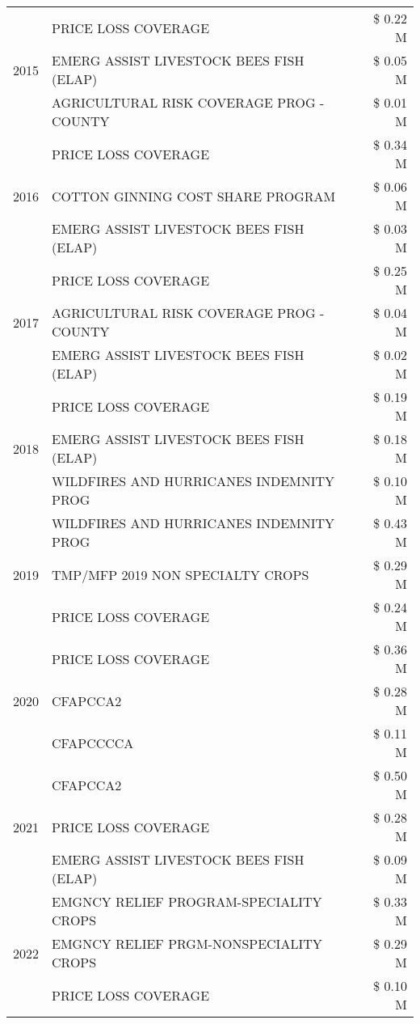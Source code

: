 \begin{tabular}{llr}
\cline{1-3}
\multirow[t]{3}{*}{2015} & PRICE LOSS COVERAGE & \$ 0.22 M \\
 & EMERG ASSIST LIVESTOCK BEES FISH (ELAP) & \$ 0.05 M \\
 & AGRICULTURAL RISK COVERAGE PROG - COUNTY & \$ 0.01 M \\
\cline{1-3}
\multirow[t]{3}{*}{2016} & PRICE LOSS COVERAGE & \$ 0.34 M \\
 & COTTON GINNING COST SHARE PROGRAM & \$ 0.06 M \\
 & EMERG ASSIST LIVESTOCK BEES FISH (ELAP) & \$ 0.03 M \\
\cline{1-3}
\multirow[t]{3}{*}{2017} & PRICE LOSS COVERAGE & \$ 0.25 M \\
 & AGRICULTURAL RISK COVERAGE PROG - COUNTY & \$ 0.04 M \\
 & EMERG ASSIST LIVESTOCK BEES FISH (ELAP) & \$ 0.02 M \\
\cline{1-3}
\multirow[t]{3}{*}{2018} & PRICE LOSS COVERAGE & \$ 0.19 M \\
 & EMERG ASSIST LIVESTOCK BEES FISH (ELAP) & \$ 0.18 M \\
 & WILDFIRES AND HURRICANES INDEMNITY PROG & \$ 0.10 M \\
\cline{1-3}
\multirow[t]{3}{*}{2019} & WILDFIRES AND HURRICANES INDEMNITY PROG & \$ 0.43 M \\
 & TMP/MFP 2019 NON SPECIALTY CROPS & \$ 0.29 M \\
 & PRICE LOSS COVERAGE & \$ 0.24 M \\
\cline{1-3}
\multirow[t]{3}{*}{2020} & PRICE LOSS COVERAGE & \$ 0.36 M \\
 & CFAPCCA2 & \$ 0.28 M \\
 & CFAPCCCCA & \$ 0.11 M \\
\cline{1-3}
\multirow[t]{3}{*}{2021} & CFAPCCA2 & \$ 0.50 M \\
 & PRICE LOSS COVERAGE & \$ 0.28 M \\
 & EMERG ASSIST LIVESTOCK BEES FISH (ELAP) & \$ 0.09 M \\
\cline{1-3}
\multirow[t]{3}{*}{2022} & EMGNCY RELIEF PROGRAM-SPECIALITY CROPS & \$ 0.33 M \\
 & EMGNCY RELIEF PRGM-NONSPECIALITY CROPS & \$ 0.29 M \\
 & PRICE LOSS COVERAGE & \$ 0.10 M \\
\cline{1-3}
\bottomrule
\end{tabular}
